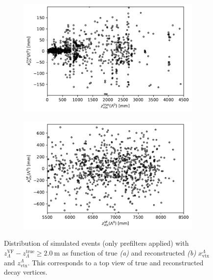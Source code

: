 \begin{figure}[t]
	\centering
	\begin{subfigure}{.45\textwidth}
		\includegraphics[width=\textwidth]{graphics/05-angular_distributions/bump_Lambda_true_endvertex_z_vs_x.pdf}
		\caption{}
		\label{fig:5:bump_true}
	\end{subfigure}
	\begin{subfigure}{.45\textwidth}
		\includegraphics[width=\textwidth]{graphics/05-angular_distributions/bump_scatter_Lambda_endvertex_z_vs_x.pdf}
		\caption{}
		\label{fig:5:bump_reco}
	\end{subfigure}
	\caption{Distribution of simulated \demonstratorshort events (only prefilters applied) with $z_\Lambda^\text{VF} - z_\Lambda^\text{true} \geq \SI{2.0}{\meter}$ as function of true \textit{(a)} and reconstructed \textit{(b)} $x^\Lambda_\text{vtx}$ and $z_\text{vtx}^\Lambda$. This corresponds to a top view of true and reconstructed \lz decay vertices.}
	\label{fig:5:bump}
\end{figure}

